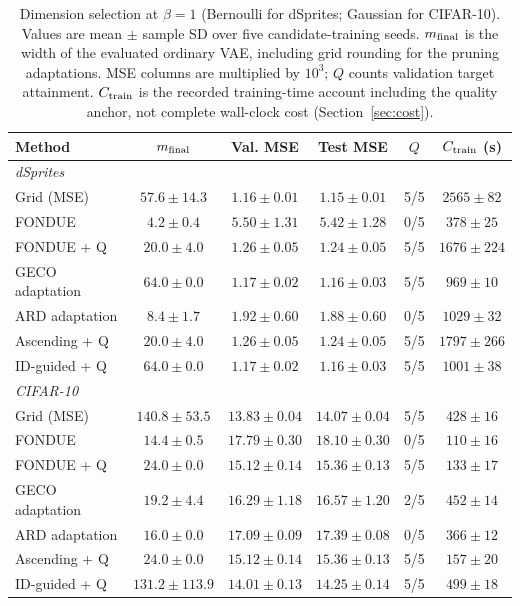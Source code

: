 \begin{table}[H]
\caption{Dimension selection at $\beta=1$ (Bernoulli for dSprites; Gaussian for CIFAR-10). Values are mean $\pm$ sample SD over five candidate-training seeds. $m_{\rm final}$ is the width of the evaluated ordinary VAE, including grid rounding for the pruning adaptations. MSE columns are multiplied by $10^3$; $Q$ counts validation target attainment. $C_{\rm train}$ is the recorded training-time account including the quality anchor, not complete wall-clock cost (Section~\ref{sec:cost}).}\label{tab:main2}
\footnotesize
\setlength{\tabcolsep}{3.5pt}
\begin{tabular*}{\textwidth}{@{\extracolsep{\fill}}lccccc@{}}
\toprule
Method & $m_{\rm final}$ & Val. MSE & Test MSE & $Q$ & $C_{\rm train}$ (s) \\
\midrule
\multicolumn{6}{l}{\emph{dSprites}} \\
Grid (MSE) & $57.6 \pm 14.3$ & $1.16 \pm 0.01$ & $1.15 \pm 0.01$ & 5/5 & $2565 \pm 82$ \\
FONDUE & $4.2 \pm 0.4$ & $5.50 \pm 1.31$ & $5.42 \pm 1.28$ & 0/5 & $378 \pm 25$ \\
FONDUE + Q & $20.0 \pm 4.0$ & $1.26 \pm 0.05$ & $1.24 \pm 0.05$ & 5/5 & $1676 \pm 224$ \\
GECO adaptation & $64.0 \pm 0.0$ & $1.17 \pm 0.02$ & $1.16 \pm 0.03$ & 5/5 & $969 \pm 10$ \\
ARD adaptation & $8.4 \pm 1.7$ & $1.92 \pm 0.60$ & $1.88 \pm 0.60$ & 0/5 & $1029 \pm 32$ \\
Ascending + Q & $20.0 \pm 4.0$ & $1.26 \pm 0.05$ & $1.24 \pm 0.05$ & 5/5 & $1797 \pm 266$ \\
ID-guided + Q & $64.0 \pm 0.0$ & $1.17 \pm 0.02$ & $1.16 \pm 0.03$ & 5/5 & $1001 \pm 38$ \\
\midrule
\multicolumn{6}{l}{\emph{CIFAR-10}} \\
Grid (MSE) & $140.8 \pm 53.5$ & $13.83 \pm 0.04$ & $14.07 \pm 0.04$ & 5/5 & $428 \pm 16$ \\
FONDUE & $14.4 \pm 0.5$ & $17.79 \pm 0.30$ & $18.10 \pm 0.30$ & 0/5 & $110 \pm 16$ \\
FONDUE + Q & $24.0 \pm 0.0$ & $15.12 \pm 0.14$ & $15.36 \pm 0.13$ & 5/5 & $133 \pm 17$ \\
GECO adaptation & $19.2 \pm 4.4$ & $16.29 \pm 1.18$ & $16.57 \pm 1.20$ & 2/5 & $452 \pm 14$ \\
ARD adaptation & $16.0 \pm 0.0$ & $17.09 \pm 0.09$ & $17.39 \pm 0.08$ & 0/5 & $366 \pm 12$ \\
Ascending + Q & $24.0 \pm 0.0$ & $15.12 \pm 0.14$ & $15.36 \pm 0.13$ & 5/5 & $157 \pm 20$ \\
ID-guided + Q & $131.2 \pm 113.9$ & $14.01 \pm 0.13$ & $14.25 \pm 0.14$ & 5/5 & $499 \pm 18$ \\
\bottomrule
\end{tabular*}
\end{table}
